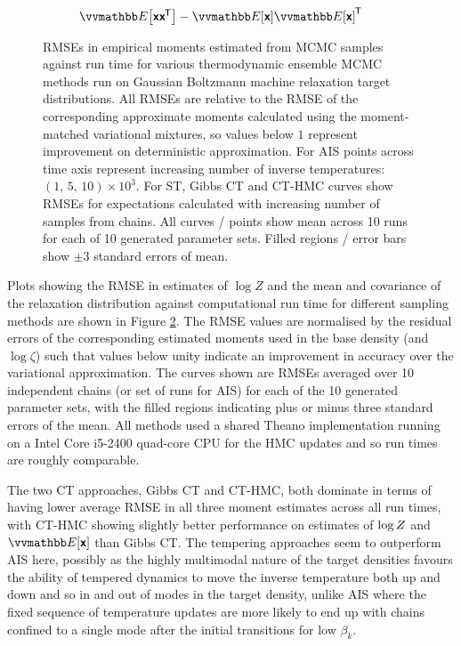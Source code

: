 \begin{figure}
\begin{subfigure}[b]{.7\linewidth}
\caption{$\expc{\rvct{x}\rvct{x}\tr} - \expc{\rvct{x}}\expc{\rvct{x}}\tr$}\label{sfig:bmr-30-unit-scale-6-covar}
\end{subfigure}
\caption[Boltzmann machine relaxation results.]{\acp{RMSE} in empirical moments estimated from \ac{MCMC} samples against run time for various thermodynamic ensemble \ac{MCMC} methods run on Gaussian Boltzmann machine relaxation target distributions. All \acp{RMSE} are relative to the \ac{RMSE} of the corresponding approximate moments calculated using the moment-matched variational mixtures, so values below $1$ represent improvement on deterministic approximation. For \ac{AIS} points across time axis represent increasing number of inverse temperatures: $(1,\, 5,\,10)\times 10^3$. For \ac{ST}, Gibbs \ac{CT} and \ac{CT-HMC} curves show \acp{RMSE} for expectations calculated with increasing number of samples from chains. All curves / points show mean across 10 runs for each of 10 generated parameter sets. Filled regions / error bars show $\pm 3$ standard errors of mean.}
\label{fig:bmr-30-unit-scale-6-results}
\end{figure}

Plots showing the \ac{RMSE} in estimates of $\log Z$ and the mean and covariance of the relaxation distribution against computational run time for different sampling methods are shown in Figure \ref{fig:bmr-30-unit-scale-6-results}. The \ac{RMSE} values are normalised by the residual errors of the corresponding estimated moments used in the base density (and $\log\zeta$) such that values below unity indicate an improvement in accuracy over the variational approximation. The curves shown are \ac{RMSE}s averaged over 10 independent chains (or set of runs for \ac{AIS}) for each of the 10 generated parameter sets, with the filled regions indicating plus or minus three standard errors of the mean. All methods used a shared Theano \citep{theano2016theano} implementation running on a Intel Core i5-2400 quad-core CPU for the \ac{HMC} updates and so run times are roughly comparable.

The two \ac{CT} approaches, Gibbs \ac{CT} and \ac{CT-HMC}, both dominate in terms of having lower average \ac{RMSE} in all three moment estimates across all run times, with \ac{CT-HMC} showing slightly better performance on estimates of $\log Z$ and $\expc{\rvct{x}}$ than Gibbs \ac{CT}. The tempering approaches seem to outperform \ac{AIS} here, possibly as the highly multimodal nature of the target densities favours the ability of tempered dynamics to move the inverse temperature both up and down and so in and out of modes in the target density, unlike \ac{AIS} where the fixed sequence of temperature updates are more likely to end up with chains confined to a single mode after the initial transitions for low $\beta_k$.

